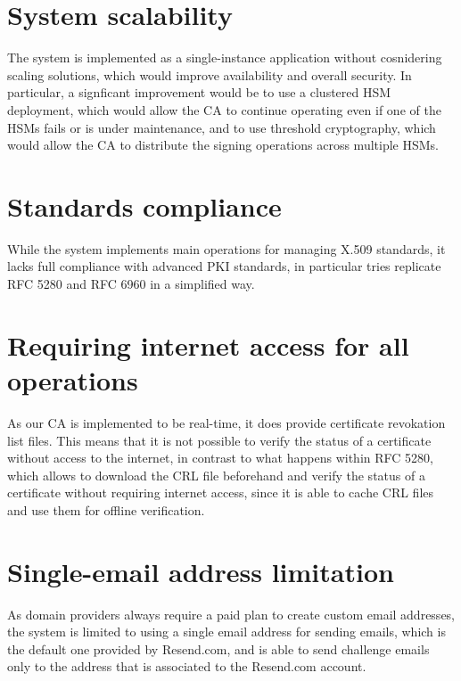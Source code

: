 \section{System scalability}

The system is implemented as a single-instance application without cosnidering scaling solutions, which
would improve availability and overall security. In particular, a signficant improvement would be
to use a clustered HSM deployment, which would allow the CA to continue operating even if one of the HSMs
fails or is under maintenance, and to use threshold cryptography, which would allow the CA to distribute
the signing operations across multiple HSMs.

\section{Standards compliance}

While the system implements main operations for managing X.509 standards, it lacks full compliance 
with advanced PKI standards, in particular tries replicate RFC 5280 and RFC 6960 in a simplified way.

\section{Requiring internet access for all operations}
As our CA is implemented to be real-time, it does provide certificate revokation list files. This means 
that it is not possible to verify the status of a certificate without access to the internet, in contrast 
to what happens within RFC 5280, which allows to download the CRL file beforehand and verify the status 
of a certificate without requiring internet access, since it is able to cache CRL files and use them for 
offline verification.

\section{Single-email address limitation}
As domain providers always require a paid plan to create custom email addresses, the system is limited
to using a single email address for sending emails, which is the default one provided by Resend.com, and
is able to send challenge emails only to the address that is associated to the Resend.com account.